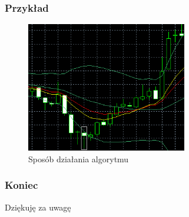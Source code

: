\documentclass{beamer}
\begin{document}

\begin{frame}
\frametitle{Przykład}
\begin{figure}[ht]
\begin{center}
\includegraphics[width=7cm]{sample.png}
\caption{Sposób działania algorytmu}
\end{center}
\end{figure} 


\end{frame}


\begin{frame}
\frametitle{Koniec}
\begin{center}
Dziękuję za uwagę
\end{center}

\end{frame}

\end{document}
